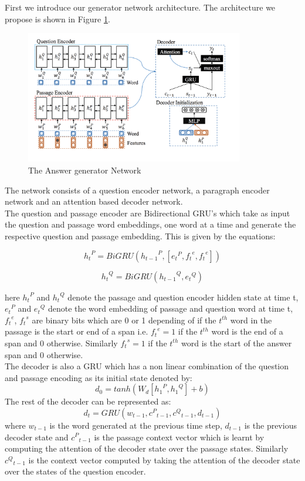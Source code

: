 First we introduce our generator network architecture. The architecture we propose is shown in Figure \ref{im:im_gen}.
\begin{figure}[h]
    \centering
    \includegraphics[width=0.85\textwidth]{images/ans_net.png}
    \caption{The Answer generator Network}
    \label{im:im_gen}
\end{figure}

The network consists of a question encoder network, a paragraph encoder network and an attention based decoder network.\\
The question and passage encoder are Bidirectional GRU's which take as input the question and passage word embeddings, one word at a time and generate the respective question and passage embedding. This is given by the equations:

\[ {h_t}^P = BiGRU({h_{t-1}}^P, [{e_t}^P, {f_t}^e, {f_t}^e]) \]

\[{h_t}^Q = BiGRU({h_{t-1}}^Q, {e_t}^Q) \]

here ${h_t}^P$ and ${h_t}^Q$ denote the passage and question encoder hidden state at time t, ${e_t}^P$ and ${e_t}^Q$ denote the word embedding of  passage and question word at time t, ${f_t}^e$, ${f_t}^s$ are binary bits which are 0 or 1 depending of if the $t^{th}$ word in the passage is the start or end of a span i.e.  ${f_t}^e = 1$ if the $t^{th}$ word is the end of a span and 0 otherwise. Similarly ${f_t}^s = 1$ if the $t^{th}$ word is the start of the answer span and 0 otherwise.\\
The decoder is also a GRU which has a non linear combination of the question and passage encoding as its initial state denoted by:
\[ d_0 = tanh(W_d[{h_1}^P, {h_1}^Q] + b) \]
The rest of the decoder can be represented as:
\[d_t = GRU(w_{t-1}, {c^P}_{t-1}, {c^Q}_{t-1}, d_{t-1})\]
where $w_{t−1}$ is the word generated at the previous time step, $d_{t−1}$ is the previous decoder state and ${c^P}_{t-1}$ is the passage context vector which is learnt by computing the attention of the decoder state over the passage states. Similarly ${c^Q}_{t-1}$ is the context vector computed by taking the attention of the decoder state over the states of the question encoder. 

